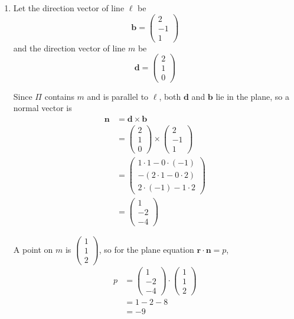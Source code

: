 \documentclass[leqno]{article}
\begin{document}
\begin{enumerate}[
  label=\textbf{\arabic*.},
  leftmargin=*,
  topsep=0pt,
  partopsep=0pt,
  parsep=0pt
]
\begin{tcolorbox}[colback=white, colframe=scarlet, title={\textbf{Solution}}, breakable, grow to left by=6mm, grow to right by=10mm]
\begin{enumerate}[label=\textbf{(\roman*)}]
  \item Let the direction vector of line \(\ell\) be
\[
\mathbf b=\begin{pmatrix}2\\-1\\1\end{pmatrix}
\]
and the direction vector of line \(m\) be
\[
\mathbf d=\begin{pmatrix}2\\1\\0\end{pmatrix}
\]

Since \(\Pi\) contains \(m\) and is parallel to \(\ell\), both \(\mathbf d\) and \(\mathbf b\) lie in the plane, so a normal vector is
\begin{align*}
\mathbf n&=\mathbf d\times \mathbf b \\
&=\begin{pmatrix}2\\1\\0\end{pmatrix}\times \begin{pmatrix}2\\-1\\1\end{pmatrix} \\
&=\begin{pmatrix}
1\cdot 1-0\cdot (-1)\\
-\left(2\cdot 1-0\cdot 2\right)\\
2\cdot (-1)-1\cdot 2
\end{pmatrix} \\
&=\begin{pmatrix}1\\-2\\-4\end{pmatrix}
\end{align*}

A point on \(m\) is \(\begin{pmatrix}1\\1\\2\end{pmatrix}\), so for the plane equation \(\mathbf r\cdot \mathbf n=p\),
\begin{align*}
p&=\begin{pmatrix}1\\-2\\-4\end{pmatrix}\cdot \begin{pmatrix}1\\1\\2\end{pmatrix} \\
&=1-2-8 \\
&=-9
\end{align*}


\end{enumerate}
\end{tcolorbox}
\end{enumerate}
\end{document}
